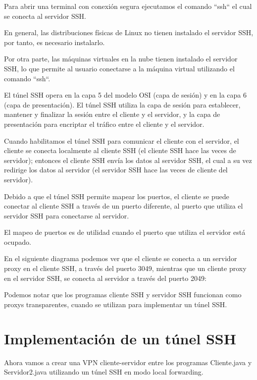 Para abrir una terminal con conexión segura ejecutamos el comando ``ssh`` el cual se conecta al servidor SSH.

En general, las distribuciones físicas de Linux no tienen instalado el servidor SSH, por tanto, es necesario instalarlo.

Por otra parte, las máquinas virtuales en la nube tienen instalado el servidor SSH, lo que permite al usuario conectarse a la máquina virtual utilizando el comando ``ssh``.

El túnel SSH opera en la capa 5 del modelo OSI (capa de sesión) y en la capa 6 (capa de presentación). El túnel SSH utiliza la capa de sesión para establecer, mantener y finalizar la sesión entre el cliente y el servidor, y la capa de presentación para encriptar el tráfico entre el cliente y el servidor.

Cuando habilitamos el túnel SSH para comunicar el cliente con el servidor, el cliente se conecta localmente al cliente SSH (el cliente SSH hace las veces de servidor); entonces el cliente SSH envía los datos al servidor SSH, el cual a su vez redirige los datos al servidor (el servidor SSH hace las veces de cliente del servidor).

Debido a que el túnel SSH permite mapear los puertos, el cliente se puede conectar al cliente SSH a través de un puerto diferente, al puerto que utiliza el servidor SSH para conectarse al servidor.

El mapeo de puertos es de utilidad cuando el puerto que utiliza el servidor está ocupado.

En el siguiente diagrama podemos ver que el cliente se conecta a un servidor proxy en el cliente SSH, a través del puerto 3049, mientras que un cliente proxy en el servidor SSH, se conecta al servidor a través del puerto 2049:

Podemos notar que los programas cliente SSH y servidor SSH funcionan como proxys transparentes, cuando se utilizan para implementar un túnel SSH.

\section{Implementación de un túnel SSH}

Ahora vamos a crear una VPN cliente-servidor entre los programas Cliente.java y Servidor2.java utilizando un túnel SSH en modo local forwarding.

